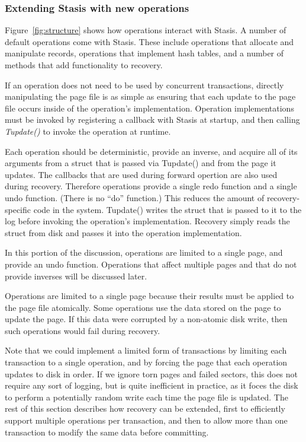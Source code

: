 \documentclass[letterpaper,twocolumn,10pt]{article}
\newcommand{\yad}{Stasis\xspace}
\begin{document}
\subsubsection{Extending \yad with new operations}

Figure~\ref{fig:structure} shows how operations interact with \yad.  A
number of default operations come with \yad.  These include operations
that allocate and manipulate records, operations that implement hash
tables, and a number of methods that add functionality to recovery.

If an operation does not need to be used by concurrent
transactions, directly manipulating the page file is as simple as
ensuring that each update to the page file occurs inside of the
operation's implementation.  Operation implementations must be invoked
by registering a callback with \yad at startup, and then calling {\em
Tupdate()} to invoke the operation at runtime.  

Each operation should be deterministic, provide an inverse, and
acquire all of its arguments from a struct that is passed via
Tupdate() and from the page it updates.  The callbacks that are used
during forward opertion are also used during recovery.  Therefore
operations provide a single redo function and a single undo function.
(There is no ``do'' function.)  This reduces the amount of
recovery-specific code in the system.  Tupdate() writes the struct
that is passed to it to the log before invoking the operation's
implementation.  Recovery simply reads the struct from disk and passes
it into the operation implementation.

In this portion of the discussion, operations are limited
to a single page, and provide an undo function.  Operations that
affect multiple pages and that do not provide inverses will be
discussed later.

Operations are limited to a single page because their results must be
applied to the page file atomically.  Some operations use the data
stored on the page to update the page.  If this data were corrupted by
a non-atomic disk write, then such operations would fail during recovery.

Note that we could implement a limited form of transactions by
limiting each transaction to a single operation, and by forcing the
page that each operation updates to disk in order.  If we ignore torn 
pages and failed sectors, this does not
require any sort of logging, but is quite inefficient in practice, as
it foces the disk to perform a potentially random write each time the
page file is updated.  The rest of this section describes how recovery
can be extended, first to efficiently support multiple operations per
transaction, and then to allow more than one transaction to modify the
same data before committing.
\end{document}
